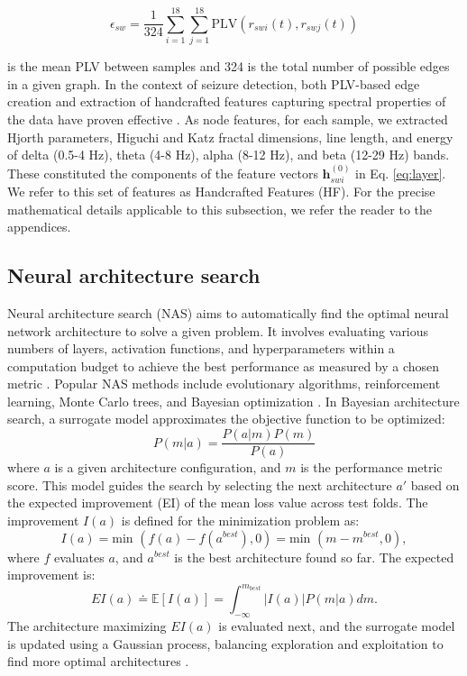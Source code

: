 \documentclass[a4paper,fleqn]{cas-sc}
\begin{document}
\begin{equation}
    \epsilon_{sw} = \frac{1}{324} \sum_{i=1}^{18}\sum_{j=1}^{18} \text{PLV}(r_{swi}(t), r_{swj}(t))
\end{equation}

is the mean PLV between samples and 324 is the total number of possible edges in a given graph. In the context of seizure detection, both PLV-based edge creation and extraction of handcrafted features capturing spectral properties of the data have proven effective \cite{wang2023plvgraphs,JiaEfficientGraphConv, wijayanto2019fdepilepsy}. As node features, for each sample, we extracted Hjorth parameters, Higuchi and Katz fractal dimensions, line length, and energy of delta (0.5-4 Hz), theta (4-8 Hz), alpha (8-12 Hz), and beta (12-29 Hz) bands. These constituted the components of the feature vectors $\textbf{h}_{swi}^{(0)}$ in Eq. \ref{eq:layer}. We refer to this set of features as Handcrafted Features (HF). For the precise mathematical details applicable to this subsection, we refer the reader to the appendices.

\subsection{Neural architecture search}

Neural architecture search (NAS) aims to automatically find the optimal neural network architecture to solve a given problem. It involves evaluating various numbers of layers, activation functions, and hyperparameters within a computation budget to achieve the best performance as measured by a chosen metric \cite{white2023neural}. Popular NAS methods include evolutionary algorithms, reinforcement learning, Monte Carlo trees, and Bayesian optimization \cite{white2023neural}. In Bayesian architecture search, a surrogate model approximates the objective function to be optimized:
\begin{equation} \label{NAS_surrogate}
    P(m|a) =  \frac{P(a|m)P(m)}{P(a)}
\end{equation}
where $a$ is a given architecture configuration, and $m$ is the performance metric score. This model guides the search by selecting the next architecture $a'$ based on the expected improvement (EI) of the mean loss value across test folds. The improvement $I(a)$ is defined for the minimization problem as:
\begin{equation}
    I(a) = \text{min }(f(a) - f(a^{best}),0) = \text{min }(m - m^{best},0),
\end{equation}
where $f$ evaluates $a$, and $a^{best}$ is the best architecture found so far. The expected improvement is:
\begin{equation}
    EI(a) \doteq \mathbb{E}[I(a)] = \int_{-\infty}^{m_{best}}|I(a)|P(m|a)dm.
\end{equation}
The architecture maximizing $EI(a)$ is evaluated next, and the surrogate model is updated using a Gaussian process, balancing exploration and exploitation to find more optimal architectures \cite{elsken2019neural,white2023neural}.
\end{document}
